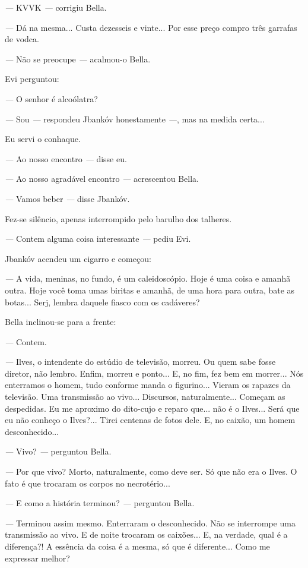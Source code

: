 \emph{---} KVVK \emph{---} corrigiu Bella.

\emph{---} Dá na mesma... Custa dezesseis e vinte... Por esse preço
compro três garrafas de vodca.

\emph{---} Não se preocupe \emph{---} acalmou-o Bella.

Evi perguntou:

\emph{---} O senhor é alcoólatra?

\emph{---} Sou \emph{---} respondeu Jbankóv honestamente \emph{---}, mas
na medida certa...

Eu servi o conhaque.

\emph{---} Ao nosso encontro \emph{---} disse eu.

\emph{---} Ao nosso agradável encontro \emph{---} acrescentou Bella.

\emph{---} Vamos beber \emph{---} disse Jbankóv.

Fez-se silêncio, apenas interrompido pelo barulho dos talheres.

\emph{---} Contem alguma coisa interessante \emph{---} pediu Evi.

Jbankóv acendeu um cigarro e começou:

\emph{---} A vida, meninas, no fundo, é um caleidoscópio. Hoje é uma
coisa e amanhã outra. Hoje você toma umas biritas e amanhã, de uma hora
para outra, bate as botas... Serj, lembra daquele fiasco com os
cadáveres?

Bella inclinou-se para a frente:

\emph{---} Contem.

\emph{---} Ilves, o intendente do estúdio de televisão, morreu. Ou quem
sabe fosse diretor, não lembro. Enfim, morreu e ponto... E, no fim, fez
bem em morrer... Nós enterramos o homem, tudo conforme manda o
figurino... Vieram os rapazes da televisão. Uma transmissão ao vivo...
Discursos, naturalmente... Começam as despedidas. Eu me aproximo do
dito-cujo e reparo que... não é o Ilves... Será que eu não conheço o
Ilves?... Tirei centenas de fotos dele. E, no caixão, um homem
desconhecido...

\emph{---} Vivo? \emph{---} perguntou Bella.

\emph{---} Por que vivo? Morto, naturalmente, como deve ser. Só que não
era o Ilves. O fato é que trocaram os corpos no necrotério...

\emph{---} E como a história terminou? \emph{---} perguntou Bella.

\emph{---} Terminou assim mesmo. Enterraram o desconhecido. Não se
interrompe uma transmissão ao vivo. E de noite trocaram os caixões... E,
na verdade, qual é a diferença?! A essência da coisa é a mesma, só que é
diferente... Como me expressar melhor?

